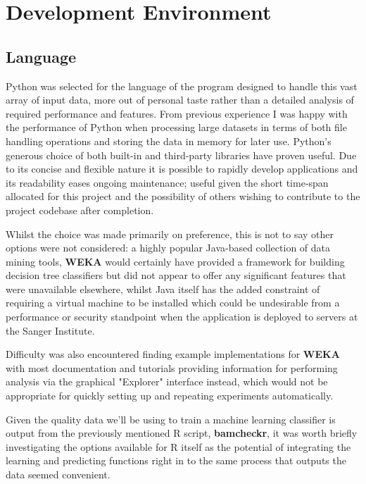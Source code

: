 \section{Development Environment}
\subsection{Language}
\label{part1:dev:lang}

Python was selected for the language of the program designed to handle this vast
array of input data, more out of personal taste rather than a detailed analysis
of required performance and features. From previous experience I was happy with
the performance of Python when processing large datasets in terms of both
file handling operations and storing the data in memory for later use. Python's
generous choice of both built-in and third-party libraries have proven useful.
Due to its concise and flexible nature it is possible to rapidly
develop applications and its readability eases ongoing maintenance; useful given
the short time-span allocated for this project and the possibility of others
wishing to contribute to the project codebase after completion.

Whilst the choice was made primarily on preference, this is not to say other
options were not considered: a highly popular Java-based collection of data
mining tools, \textbf{WEKA}\citep{weka} would certainly have provided a
framework for building decision tree classifiers but did not
appear to offer any significant features that were unavailable elsewhere, whilst
Java itself has the added constraint of requiring a virtual machine to be
installed which could be undesirable from a performance or security
standpoint when the application is deployed to servers at the Sanger Institute.


Difficulty was also encountered finding example implementations for \textbf{WEKA}
with most documentation and tutorials providing information for performing
analysis via the graphical "Explorer" interface instead, which would not be
appropriate for quickly setting up and repeating experiments automatically.

Given the quality data we'll be using to train a machine learning classifier is
output from the previously mentioned R script, \textbf{bamcheckr}, it was worth
briefly investigating the options available for R itself as the potential of
integrating the learning and predicting functions right in to the same process
that outputs the data seemed convenient.

